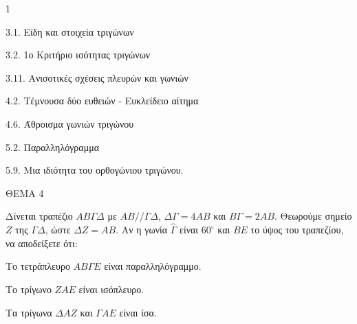 \begin{ylh}{1}
    \item 3.1. Είδη και στοιχεία τριγώνων
    \item 3.2. 1ο Κριτήριο ισότητας τριγώνων
    \item 3.11. Ανισοτικές σχέσεις πλευρών και γωνιών
    \item 4.2. Τέμνουσα δύο ευθειών - Ευκλείδειο αίτημα
    \item 4.6. Άθροισμα γωνιών τριγώνου
    \item 5.2. Παραλληλόγραμμα
    \item 5.9. Μια ιδιότητα του ορθογώνιου τριγώνου.
\end{ylh}

ΘΕΜΑ 4

Δίνεται τραπέζιο $ΑΒ\Gamma\Delta$ με $ΑΒ // \Gamma\Delta$, $\Delta\Gamma = 4ΑΒ$ και $Β\Gamma = 2ΑΒ$. Θεωρούμε σημείο $Z$ της $\Gamma\Delta$, ώστε $\Delta Z = ΑΒ$. Αν η γωνία $\widehat{\Gamma}$ είναι $60^{\circ}$ και $BE$ το ύψος του τραπεζίου, να αποδείξετε ότι:

\begin{alist}
\item Το τετράπλευρο $ΑΒ\Gamma E$ είναι παραλληλόγραμμο. 
\item Το τρίγωνο $ZAE$ είναι ισόπλευρο. 
\item Τα τρίγωνα $\Delta AZ$ και $\Gamma AE$ είναι ίσα. 

\begin{center}
\end{center}
\end{alist}
